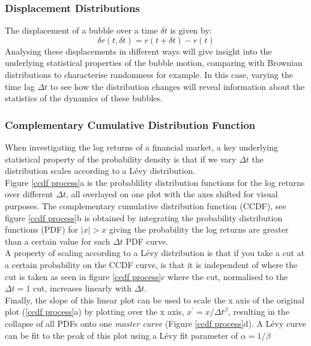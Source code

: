 \subsubsection{Displacement Distributions}
The displacement of a bubble over a time $\delta t$ is given by:
\begin{equation}
    \delta r(t, \delta t) = r(t+\delta t) - r(t)
\end{equation}
Analysing these displacements in different ways will give insight into the underlying statistical properties of the bubble motion, comparing with Brownian distributions to characterise randomness for example. In this case, varying the time lag $\Delta t$ to see how the distribution changes will reveal information about the statistics of the dynamics of these bubbles.\\


\subsubsection{Complementary Cumulative Distribution Function}
When investigating the log returns of a financial market, a key underlying statistical property of the probability density is that if we vary $\Delta t$ the distribution scales according to a Lévy distribution.\\

Figure \ref{ccdf process}a is the probablility distribution functions for the log returns over different $\Delta t$, all overlayed on one plot with the axes shifted for visual purposes. The complementary cumulative distribution function (CCDF), see figure \ref{ccdf process}b is obtained by integrating the probability distribution functions (PDF) for $|x| > x$ giving the probability the log returns are greater than a certain value for each $\Delta t$ PDF curve.\\

A property of scaling according to a Lévy distribution is that if you take a cut at a certain probability on the CCDF curve, is that it is independent of where the cut is taken as seen in figure \ref{ccdf process}c where the cut, normalised to the $\Delta t = 1$ cut, increases linearly with $\Delta t$.\\

Finally, the slope of this linear plot can be used to scale the x axis of the original plot (\ref{ccdf process}a) by plotting over the x axis, $x^\prime = x/\Delta t ^\beta$, resulting in the collapse of all PDFs onto one \textit{master curve} (Figure \ref{ccdf process}d). A Lévy curve can be fit to the peak of this plot using a Lévy fit parameter of $\alpha = 1/\beta$\\

